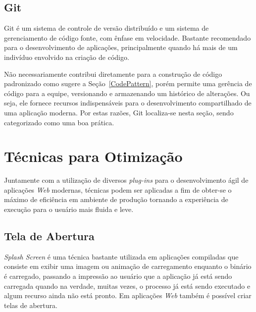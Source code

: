 \subsection{Git}
\label{SubGit}

Git é um sistema de controle de versão distribuído e um sistema de gerenciamento de código fonte, com ênfase em velocidade. Bastante recomendado para o desenvolvimento de aplicações, principalmente quando há mais de um indivíduo envolvido na criação de código.

Não necessariamente contribui diretamente para a construção de código padronizado como sugere a Seção~\ref{CodePattern}, porém permite uma gerência de código para a equipe, versionando e armazenando um histórico de alterações. Ou seja, ele fornece recursos indispensáveis para o desenvolvimento compartilhado de uma aplicação moderna. Por estas razões, Git localiza-se nesta seção, sendo categorizado como uma boa prática.
%
%
%
%
%
%
%
%
%
\section{Técnicas para Otimização}
\label{Otimizacao}

Juntamente com a utilização de diversos \textit{plug-ins} para o desenvolvimento ágil de aplicações \textit{Web} modernas, técnicas podem ser aplicadas a fim de obter-se o máximo de eficiência em ambiente de produção tornando a experiência de execução para o usuário mais fluida e leve.

\subsection{Tela de Abertura}
\label{SubSplashScreen}

\textit{Splash Screen} é uma técnica bastante utilizada em aplicações compiladas que consiste em exibir uma imagem ou animação de carregamento enquanto o binário é carregado, passando a impressão ao usuário que a aplicação já está sendo carregada quando na verdade, muitas vezes, o processo já está sendo executado e algum recurso ainda não está pronto. Em aplicações \textit{Web} também é possível criar telas de abertura.

